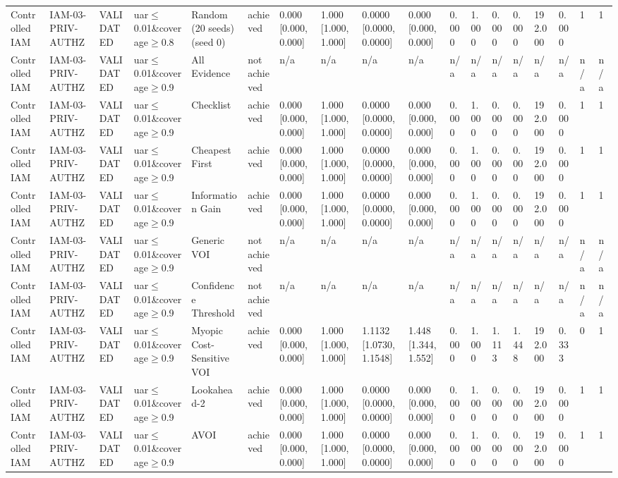 \begin{table}[!ht]
{\begin{tabular}{llllllllllllllllll}
Controlled IAM & IAM-03-PRIV-AUTHZ & VALIDATED & uar$\le$0.01\&coverage$\ge$0.8 & Random (20 seeds) (seed 0) & achieved & 0.000 [0.000, 0.000] & 1.000 [1.000, 1.000] & 0.0000 [0.0000, 0.0000] & 0.000 [0.000, 0.000] & 0.000 & 1.000 & 0.000 & 0.000 & 192.000 & 0.000 & 1 & 1 \\
Controlled IAM & IAM-03-PRIV-AUTHZ & VALIDATED & uar$\le$0.01\&coverage$\ge$0.9 & All Evidence & not achieved & n/a & n/a & n/a & n/a & n/a & n/a & n/a & n/a & n/a & n/a & n/a & n/a \\
Controlled IAM & IAM-03-PRIV-AUTHZ & VALIDATED & uar$\le$0.01\&coverage$\ge$0.9 & Checklist & achieved & 0.000 [0.000, 0.000] & 1.000 [1.000, 1.000] & 0.0000 [0.0000, 0.0000] & 0.000 [0.000, 0.000] & 0.000 & 1.000 & 0.000 & 0.000 & 192.000 & 0.000 & 1 & 1 \\
Controlled IAM & IAM-03-PRIV-AUTHZ & VALIDATED & uar$\le$0.01\&coverage$\ge$0.9 & Cheapest First & achieved & 0.000 [0.000, 0.000] & 1.000 [1.000, 1.000] & 0.0000 [0.0000, 0.0000] & 0.000 [0.000, 0.000] & 0.000 & 1.000 & 0.000 & 0.000 & 192.000 & 0.000 & 1 & 1 \\
Controlled IAM & IAM-03-PRIV-AUTHZ & VALIDATED & uar$\le$0.01\&coverage$\ge$0.9 & Information Gain & achieved & 0.000 [0.000, 0.000] & 1.000 [1.000, 1.000] & 0.0000 [0.0000, 0.0000] & 0.000 [0.000, 0.000] & 0.000 & 1.000 & 0.000 & 0.000 & 192.000 & 0.000 & 1 & 1 \\
Controlled IAM & IAM-03-PRIV-AUTHZ & VALIDATED & uar$\le$0.01\&coverage$\ge$0.9 & Generic VOI & not achieved & n/a & n/a & n/a & n/a & n/a & n/a & n/a & n/a & n/a & n/a & n/a & n/a \\
Controlled IAM & IAM-03-PRIV-AUTHZ & VALIDATED & uar$\le$0.01\&coverage$\ge$0.9 & Confidence Threshold & not achieved & n/a & n/a & n/a & n/a & n/a & n/a & n/a & n/a & n/a & n/a & n/a & n/a \\
Controlled IAM & IAM-03-PRIV-AUTHZ & VALIDATED & uar$\le$0.01\&coverage$\ge$0.9 & Myopic Cost-Sensitive VOI & achieved & 0.000 [0.000, 0.000] & 1.000 [1.000, 1.000] & 1.1132 [1.0730, 1.1548] & 1.448 [1.344, 1.552] & 0.000 & 1.000 & 1.113 & 1.448 & 192.000 & 0.333 & 0 & 1 \\
Controlled IAM & IAM-03-PRIV-AUTHZ & VALIDATED & uar$\le$0.01\&coverage$\ge$0.9 & Lookahead-2 & achieved & 0.000 [0.000, 0.000] & 1.000 [1.000, 1.000] & 0.0000 [0.0000, 0.0000] & 0.000 [0.000, 0.000] & 0.000 & 1.000 & 0.000 & 0.000 & 192.000 & 0.000 & 1 & 1 \\
Controlled IAM & IAM-03-PRIV-AUTHZ & VALIDATED & uar$\le$0.01\&coverage$\ge$0.9 & AVOI & achieved & 0.000 [0.000, 0.000] & 1.000 [1.000, 1.000] & 0.0000 [0.0000, 0.0000] & 0.000 [0.000, 0.000] & 0.000 & 1.000 & 0.000 & 0.000 & 192.000 & 0.000 & 1 & 1 \\

\end{tabular}}
\end{table}
